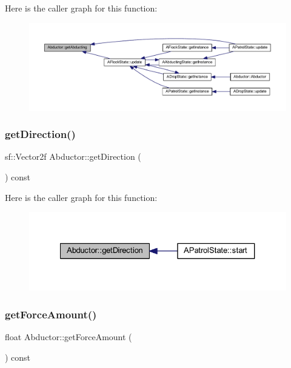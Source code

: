 Here is the caller graph for this function\+:
\nopagebreak
\begin{figure}[H]
\begin{center}
\leavevmode
\includegraphics[width=350pt]{class_abductor_ac0c62963a2e8bdac8c34bfb2a2c0b868_icgraph}
\end{center}
\end{figure}
\mbox{\label{class_abductor_a30a40083cd604343d7b1d63e1a48a3fa}} 
\subsubsection{\texorpdfstring{get\+Direction()}{getDirection()}}
{\footnotesize\ttfamily sf\+::\+Vector2f Abductor\+::get\+Direction (\begin{DoxyParamCaption}{ }\end{DoxyParamCaption}) const}

Here is the caller graph for this function\+:
\nopagebreak
\begin{figure}[H]
\begin{center}
\leavevmode
\includegraphics[width=327pt]{class_abductor_a30a40083cd604343d7b1d63e1a48a3fa_icgraph}
\end{center}
\end{figure}
\mbox{\label{class_abductor_a8bc04ea46a52e8a58feceee69a8965d0}} 
\subsubsection{\texorpdfstring{get\+Force\+Amount()}{getForceAmount()}}
{\footnotesize\ttfamily float Abductor\+::get\+Force\+Amount (\begin{DoxyParamCaption}{ }\end{DoxyParamCaption}) const}

